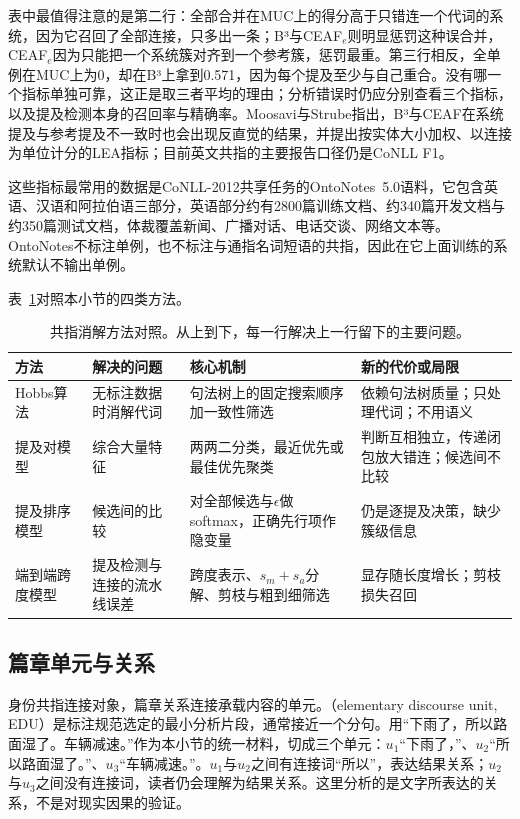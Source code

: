 表中最值得注意的是第二行：全部合并在MUC上的得分高于只错连一个代词的系统，因为它召回了全部连接，只多出一条；B³与CEAF$_e$则明显惩罚这种误合并，CEAF$_e$因为只能把一个系统簇对齐到一个参考簇，惩罚最重。第三行相反，全单例在MUC上为0，却在B³上拿到0.571，因为每个提及至少与自己重合。没有哪一个指标单独可靠，这正是取三者平均的理由；分析错误时仍应分别查看三个指标，以及提及检测本身的召回率与精确率。Moosavi与Strube指出，B³与CEAF在系统提及与参考提及不一致时也会出现反直觉的结果，并提出按实体大小加权、以连接为单位计分的LEA指标\cite{nlp-analysis-moosavi2016}；目前英文共指的主要报告口径仍是CoNLL F1。

这些指标最常用的数据是CoNLL-2012共享任务的OntoNotes~5.0语料，它包含英语、汉语和阿拉伯语三部分，英语部分约有2800篇训练文档、约340篇开发文档与约350篇测试文档，体裁覆盖新闻、广播对话、电话交谈、网络文本等。OntoNotes不标注单例，也不标注与通指名词短语的共指，因此在它上面训练的系统默认不输出单例。

表~\ref{tab:nlp-analysis-coreference-methods}对照本小节的四类方法。

\begin{table}[htbp]
  \centering
  \small
  \begin{tabularx}{\linewidth}{@{}l XXX@{}}
    \toprule
    方法 & 解决的问题 & 核心机制 & 新的代价或局限\\
    \midrule
    Hobbs算法 & 无标注数据时消解代词 & 句法树上的固定搜索顺序加一致性筛选 & 依赖句法树质量；只处理代词；不用语义\\
    提及对模型 & 综合大量特征 & 两两二分类，最近优先或最佳优先聚类 & 判断互相独立，传递闭包放大错连；候选间不比较\\
    提及排序模型 & 候选间的比较 & 对全部候选与$\epsilon$做softmax，正确先行项作隐变量 & 仍是逐提及决策，缺少簇级信息\\
    端到端跨度模型 & 提及检测与连接的流水线误差 & 跨度表示、$s_m+s_a$分解、剪枝与粗到细筛选 & 显存随长度增长；剪枝损失召回\\
    \bottomrule
  \end{tabularx}
  \caption{共指消解方法对照。从上到下，每一行解决上一行留下的主要问题。}
  \label{tab:nlp-analysis-coreference-methods}
\end{table}

\subsection{篇章单元与关系}
\label{sec:nlp-analysis-discourse-relations}

身份共指连接对象，篇章关系连接承载内容的单元。（elementary discourse unit, EDU）是标注规范选定的最小分析片段，通常接近一个分句。用“下雨了，所以路面湿了。车辆减速。”作为本小节的统一材料，切成三个单元：$u_1$“下雨了，”、$u_2$“所以路面湿了。”、$u_3$“车辆减速。”。$u_1$与$u_2$之间有连接词“所以”，表达结果关系；$u_2$与$u_3$之间没有连接词，读者仍会理解为结果关系。这里分析的是文字所表达的关系，不是对现实因果的验证。

